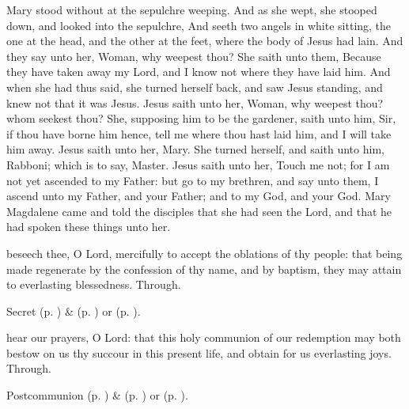 \vspace{-0.4\baselineskip}

 Mary stood without at the sepulchre weeping. And as she wept, she stooped down, and looked into the sepulchre, And seeth two angels in white sitting, the one at the head, and the other at the feet, where the body of Jesus had lain. And they say unto her, Woman, why weepest thou? She saith unto them, Because they have taken away my Lord, and I know not where they have laid him. And when she had thus said, she turned herself back, and saw Jesus standing, and knew not that it was Jesus. Jesus saith unto her, Woman, why weepest thou? whom seekest thou? She, supposing him to be the gardener, saith unto him, Sir, if thou have borne him hence, tell me where thou hast laid him, and I will take him away. Jesus saith unto her, Mary. She turned herself, and saith unto him, Rabboni; which is to say, Master. Jesus saith unto her, Touch me not; for I am not yet ascended to my Father: but go to my brethren, and say unto them, I ascend unto my Father, and your Father; and to my God, and your God. Mary Magdalene came and told the disciples that she had seen the Lord, and that he had spoken these things unto her.


\vspace{-0.3\baselineskip}

\secret
{} beseech thee, O Lord, mercifully to accept the oblations of thy people: that being made regenerate by the confession of thy name, and by baptism, they may attain to everlasting blessedness. Through.
\begin{rubric}
     Secret  (p. \pageref{EasterSecret}) \&   (p. \pageref{SPAgainst}) or  (p. \pageref{SPChiefBishop}).
\end{rubric}


\vspace{-0.3\baselineskip}

\postcommunion
{} hear our prayers, O Lord: that this holy communion of our redemption may both bestow on us thy succour in this present life, and obtain for us everlasting joys. Through.
\begin{rubric}
     Postcommunion  (p. \pageref{EasterPostcommunion}) \&   (p. \pageref{SPAgainst}) or  (p. \pageref{SPChiefBishop}).
\end{rubric}


